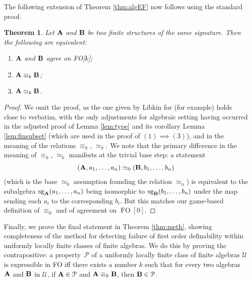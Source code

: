 \documentclass[10pt,a4paper]{amsart}
\theoremstyle{plain}
\newtheorem{thm}{Theorem}[section]
\theoremstyle{definition}
\newcommand{\up}[1]{\textup{#1}}
\newcommand{\sg}[2]{\mathrm{sg}_{#1}(#2)}
\newcommand{\FO}{\operatorname{FO}}
\begin{document}
 The following extension of Theorem \ref{thm:algEF} now follows using the standard proof. 
\begin{thm}
Let ${\bf A}$ and ${\bf B}$ be two finite structures of the same signature. Then the following are equivalent:
\begin{enumerate}
\item ${\bf A}$ and ${\bf B}$ agree on FO[$k$]\up;
\item ${\bf A}\equiv_k{\bf B}$\up;
\item ${\bf A}\simeq_k{\bf B}$.
\end{enumerate}
\end{thm}
\begin{proof}
We omit the proof, as the one given by Libkin for \cite[Theorem~3.18]{lib} (for example) holds close to verbatim, with the only adjustments for algebraic setting having occurred in the adjusted proof of Lemma \ref{lem:type} and its corollary Lemma \ref{lem:finsubset} (which are used in the proof of $(1)\implies(3)$), and in the meaning of the relations $\equiv_k$, $\simeq_k$.  We note that the primary difference in the meaning of $\equiv_k$, $\simeq_k$ manifests at the trivial base step: a statement
\[
({\bf A},a_1,\dots,a_n)\simeq_0({\bf B},b_1,\dots,b_n)
\]
(which is the base $\simeq_0$ assumption founding the relation $\simeq_n$) is equivalent to the subalgebra $\sg{\bf A}{a_1,\dots,a_n}$ being isomorphic to $\sg{\bf B}{b_1,\dots,b_n}$ under the map sending each $a_i$ to the corresponding $b_i$.  But this matches our game-based definition of $\equiv_0$ and of agreement on $\FO[0]$.
\end{proof}

Finally, we prove the final statement in Theorem \ref{thm:meth}, showing completeness of the method for detecting failure of first order definability within uniformly locally finite classes of finite algebras. We do this by proving the contrapositive: a property~$\mathcal{P}$ of a uniformly locally finite class of finite algebras $\mathscr{U}$ is expressible in FO iff there exists a number $k$ such that for every two algebras ${\bf A}$ and ${\bf B}$ in $\mathscr{U}$, if ${\bf A}\in\mathcal{P}$ and ${\bf A}\equiv_k{\bf B}$, then ${\bf B}\in\mathcal{P}$.
\end{document}
